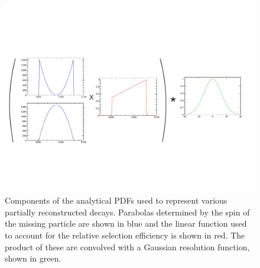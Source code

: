 \begin{figure}[!h]
    \centering
    \includegraphics[width=1.0\textwidth]{figs/B2DsKK/partreco_diagram.pdf}
    \caption{Components of the analytical PDFs used to represent various partially reconstructed  decays. Parabolas determined by the spin of the missing particle are shown in blue and the linear function used to account for the relative selection efficiency is shown in red. The product of these are convolved with a Gaussian resolution function, shown in green.} 
    \label{fig:B2DsKK_partreco_diagram}   
\end{figure}



